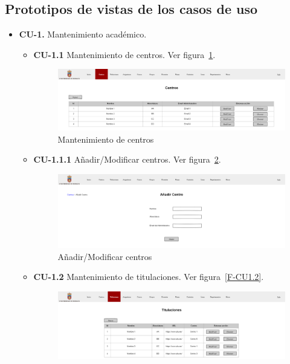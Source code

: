 \subsection{Prototipos de vistas de los casos de uso}
\begin{itemize}
	\item \textbf{CU-1.} Mantenimiento académico.
	\begin{itemize}
		\item \textbf{CU-1.1} Mantenimiento de centros. Ver figura~\ref{F-CU1.1}.
		\begin{figure}[!h]
		\centering
		\includegraphics[width=\textwidth]{../img/Anexos/Vistas/centros.png}
		\caption{Mantenimiento de centros}\label{F-CU1.1}
		\end{figure}
		\FloatBarrier
		\item \textbf{CU-1.1.1} Añadir/Modificar centros. Ver figura~\ref{F-CU1.1.1}.
		\begin{figure}[!h]
		\centering
		\includegraphics[width=\textwidth]{../img/Anexos/Vistas/add_centro.png}
		\caption{Añadir/Modificar centros}\label{F-CU1.1.1}
		\end{figure}
		\FloatBarrier
\newpage
		\item \textbf{CU-1.2} Mantenimiento de titulaciones. Ver figura~\ref{F-CU1.2}.
		\begin{figure}[!h]
		\centering
		\includegraphics[width=\textwidth]{../img/Anexos/Vistas/titulaciones.png}

\end{figure}
\end{itemize}
\end{itemize}
